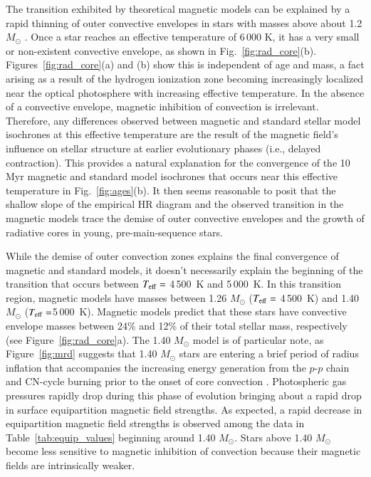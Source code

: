 \documentclass{aa}
\begin{document}
The transition exhibited by theoretical magnetic models can be explained by a rapid thinning of outer convective envelopes in stars with masses above about 1.2 $M_{\odot}$ \citep[e.g.,][]{Iben1965}. Once a star reaches an effective temperature of 6\,000 K, it has a very small or non-existent convective envelope, as shown in Fig.~\ref{fig:rad_core}(b). Figures~\ref{fig:rad_core}(a) and (b) show this is independent of age and mass, a fact arising as a result of the hydrogen ionization zone becoming increasingly localized near the optical photosphere with increasing effective temperature. In the absence of a convective envelope, magnetic inhibition of convection is irrelevant. Therefore, any differences observed between magnetic and standard stellar model isochrones at this effective temperature are the result of the magnetic field's influence on stellar structure at earlier evolutionary phases (i.e., delayed contraction). This provides a natural explanation for the convergence of the 10 Myr magnetic and standard model isochrones that occurs near this effective temperature in Fig.~\ref{fig:ages}(b). It then seems reasonable to posit that the shallow slope of the empirical HR diagram and the observed transition in the magnetic models trace the demise of outer convective envelopes and the growth of radiative cores in young, pre-main-sequence stars.

While the demise of outer convection zones explains the final convergence of magnetic and standard models, it doesn't necessarily explain the beginning of the transition that occurs between $T_{\rm eff} = $ 4\,500~K and 5\,000~K.  In this transition region, magnetic models have masses between 1.26 $M_{\odot}$ ($T_{\rm eff} = $ 4\,500~K) and 1.40 $M_{\odot}$ ($T_{\rm eff} = $5\,000~K). Magnetic models predict that these stars have convective envelope masses between 24\% and 12\% of their total stellar mass, respectively (see Figure~\ref{fig:rad_core}a). The 1.40 $M_{\odot}$ model is of particular note, as Figure~\ref{fig:mrd} suggests that 1.40 $M_{\odot}$ stars are entering a brief period of radius inflation that accompanies the increasing energy generation from the $p$-$p$ chain and CN-cycle burning prior to the onset of core convection \citep[e.g.,][]{Iben1965,Bodenheimer1965}. Photospheric gas pressures rapidly drop during this phase of evolution bringing about a rapid drop in surface equipartition magnetic field strengths. As expected, a rapid decrease in equipartition magnetic field strengths is observed among the data in Table~\ref{tab:equip_values} beginning around 1.40 $M_{\odot}$. Stars above 1.40 $M_{\odot}$ become less sensitive to magnetic inhibition of convection because their magnetic fields are intrinsically weaker.
\end{document}
